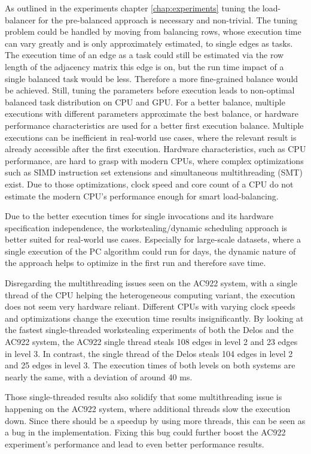 As outlined in the experiments chapter \ref{chap:experiments} tuning the load-balancer for the pre-balanced approach is necessary and non-trivial. The tuning problem could be handled by moving from balancing rows, whose execution time can vary greatly and is only approximately estimated, to single edges as tasks. The execution time of an edge as a task could still be estimated via the row length of the adjacency matrix this edge is on, but the run time impact of a single balanced task would be less. Therefore a more fine-grained balance would be achieved.
Still, tuning the parameters before execution leads to non-optimal balanced task distribution on CPU and GPU. For a better balance, multiple executions with different parameters approximate the best balance, or hardware performance characteristics are used for a better first execution balance. Multiple executions can be inefficient in real-world use cases, where the relevant result is already accessible after the first execution. Hardware characteristics, such as CPU performance, are hard to grasp with modern CPUs, where complex optimizations such as SIMD instruction set extensions and simultaneous multithreading (SMT) exist. Due to those optimizations, clock speed and core count of a CPU do not estimate the modern CPU's performance enough for smart load-balancing.

Due to the better execution times for single invocations and its hardware specification independence, the workstealing/dynamic scheduling approach is better suited for real-world use cases. Especially for large-scale datasets, where a single execution of the PC algorithm could run for days, the dynamic nature of the approach helps to optimize in the first run and therefore save time.

Disregarding the multithreading issues seen on the AC922 system, with a single thread of the CPU helping the heterogeneous computing variant, the execution does not seem very hardware reliant. Different CPUs with varying clock speeds and optimizations change the execution time results insignificantly. By looking at the fastest single-threaded workstealing experiments of both the Delos and the AC922 system, the AC922 single thread steals 108 edges in level 2 and 23 edges in level 3. In contrast, the single thread of the Delos steals 104 edges in level 2 and 25 edges in level 3. The execution times of both levels on both systems are nearly the same, with a deviation of around 40 ms.

Those single-threaded results also solidify that some multithreading issue is happening on the AC922 system, where additional threads slow the execution down. Since there should be a speedup by using more threads, this can be seen as a bug in the implementation. Fixing this bug could further boost the AC922 experiment's performance and lead to even better performance results.

